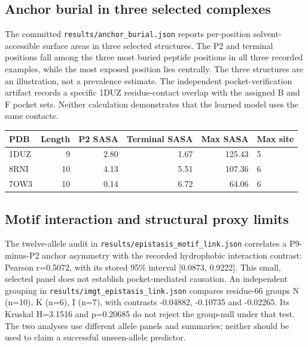 \subsection{Anchor burial in three selected complexes}
The committed \texttt{results/anchor\_burial.json} reports per-position solvent-accessible surface areas in three selected structures. The P2 and terminal positions fall among the three most buried peptide positions in all three recorded examples, while the most exposed position lies centrally. The three structures are an illustration, not a prevalence estimate. The independent pocket-verification artifact records a specific 1DUZ residue-contact overlap with the assigned B and F pocket sets. Neither calculation demonstrates that the learned model uses the same contacts.
\begin{center}\begin{tabular}{lrrrrl}\hline
PDB & Length & P2 SASA & Terminal SASA & Max SASA & Max site\\\hline
1DUZ & 9 & 2.80 & 1.67 & 125.43 & 5\\
8RNI & 10 & 4.13 & 5.51 & 107.36 & 6\\
7OW3 & 10 & 0.14 & 6.72 & 64.06 & 6\\
\hline\end{tabular}\end{center}
\subsection{Motif interaction and structural proxy limits}
The twelve-allele audit in \texttt{results/epistasis\_motif\_link.json} correlates a P9-minus-P2 anchor asymmetry with the recorded hydrophobic interaction contrast: Pearson r=0.5072, with its stored 95\% interval [0.0873, 0.9222]. This small, selected panel does not establish pocket-mediated causation. An independent grouping in \texttt{results/imgt\_epistasis\_link.json} compares residue-66 groups N (n=10), K (n=6), I (n=7), with contrasts -0.04882, -0.10735 and -0.02265. Its Kruskal H=3.1516 and p=0.20685 do not reject the group-null under that test. The two analyses use different allele panels and summaries; neither should be used to claim a successful unseen-allele predictor.
